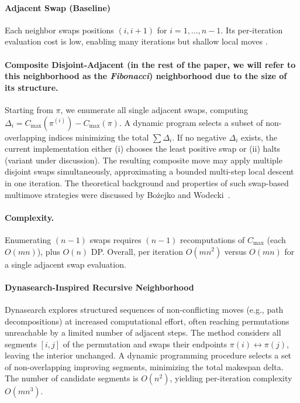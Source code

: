 \documentclass[runningheads]{llncs}
\begin{document}
\paragraph{Adjacent Swap (Baseline)}
Each neighbor swaps positions $(i,i{+}1)$ for $i=1,\dots,n-1$. Its per-iteration evaluation cost is low, enabling many iterations but shallow local moves \cite{nowicki1996fast,vanlaarhoven1992}. 


\paragraph{Composite Disjoint-Adjacent (in the rest of the paper, we will refer to this neighborhood as the \emph{Fibonacci}) neighborhood due to the size of its structure.}
Starting from $\pi$, we enumerate all single adjacent swaps, computing $\Delta_i = C_{\max}(\pi^{(i)}) - C_{\max}(\pi)$. 
A dynamic program selects a subset of non-overlapping indices minimizing the total $\sum \Delta_i$. 
If no negative $\Delta_i$ exists, the current implementation either (i) chooses the least positive swap or (ii) halts (variant under discussion). 
The resulting composite move may apply multiple disjoint swaps simultaneously, approximating a bounded multi-step local descent in one iteration.
The theoretical background and properties of such swap-based multimove strategies were discussed by Bożejko and Wodecki~\cite{Bozejko2007}.


\paragraph{Complexity.} Enumerating $(n{-}1)$ swaps requires $(n{-}1)$ recomputations of $C_{\max}$ (each $O(mn)$), plus $O(n)$ DP. Overall, per iteration $O(m n^2)$ versus $O(m n)$ for a single adjacent swap evaluation.

\paragraph{Dynasearch-Inspired Recursive Neighborhood}
Dynasearch explores structured sequences of non-conflicting moves \cite{congram2002dynasearch} (e.g., path decompositions) at increased computational effort, often reaching permutations unreachable by a limited number of adjacent steps. The method considers all segments $[i,j]$ of the permutation 
and swaps their endpoints $\pi(i) \leftrightarrow \pi(j)$, leaving the interior 
unchanged. A dynamic programming procedure selects a set of non-overlapping 
improving segments, minimizing the total makespan delta. The number of candidate 
segments is $O(n^2)$, yielding per-iteration complexity $O(mn^3)$.
\end{document}
